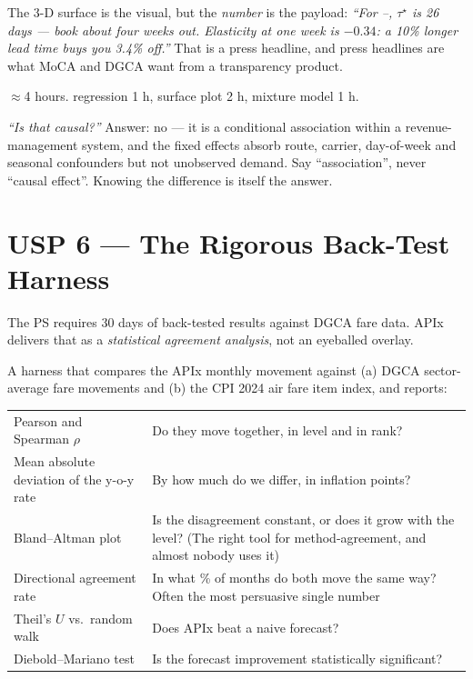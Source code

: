  The 3-D surface is the visual, but the \emph{number} is the payload:
\emph{``For --, $\tau^\star$ is 26 days --- book about four weeks out.
Elasticity at one week is $-0.34$: a 10\% longer lead time buys you 3.4\% off.''} That is a
press headline, and press headlines are what MoCA and DGCA want from a transparency product.

 $\approx$4 hours.  regression 1 h, surface plot 2 h,
mixture model 1 h.

 \emph{``Is that causal?''} Answer: no --- it is a conditional
association within a revenue-management system, and the fixed effects absorb route, carrier,
day-of-week and seasonal confounders but not unobserved demand. Say ``association'', never
``causal effect''. Knowing the difference is itself the answer.

\section{USP 6 --- The Rigorous Back-Test Harness}
\label{sec:backtest}

\begin{uspbox}
 The PS requires 30 days of back-tested results against DGCA fare data. APIx
delivers that as a \emph{statistical agreement analysis}, not an eyeballed overlay.
\end{uspbox}

 A harness that compares the APIx monthly movement against (a) DGCA
sector-average fare movements and (b) the CPI 2024 air fare item index, and reports:

\begin{center}
\footnotesize
\begin{tabularx}{\textwidth}{@{}L{4.4cm} X@{}}
\toprule
{} &  \\
\midrule
Pearson and Spearman $\rho$ & Do they move together, in level and in rank? \\
Mean absolute deviation of the y-o-y rate & By how much do we differ, in inflation points? \\
Bland--Altman plot & Is the disagreement constant, or does it grow with the level? (The right tool for method-agreement, and almost nobody uses it) \\
Directional agreement rate & In what \% of months do both move the same way? Often the most persuasive single number \\
Theil's $U$ vs.\ random walk & Does APIx beat a naive forecast? \\
Diebold--Mariano test & Is the forecast improvement statistically significant? \\
\bottomrule
\end{tabularx}
\end{center}

